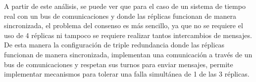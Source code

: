 A partir de este análisis, se puede ver que para el caso de un sistema de tiempo real con un bus de comunicaciones y donde las réplicas funcionan de manera sincronizada, el problema del consenso es más sencillo, ya que no se requiere el uso de 4 réplicas ni tampoco se requiere realizar tantos intercambios de mensajes.
De esta manera la configuración de triple redundancia donde las réplicas funcionan de manera sincronizada, implementan una comunicación a través de un bus de comunicaciones y respetan sus turnos para enviar mensajes, permite implementar mecanismos para tolerar una falla simultánea de 1 de las 3 réplicas.





